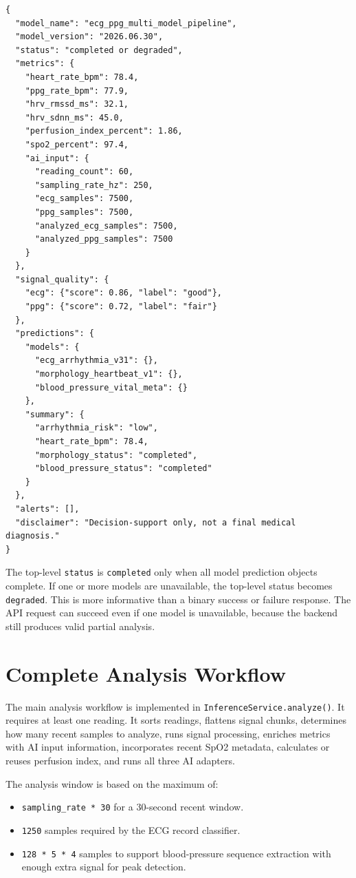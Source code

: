 \begin{lstlisting}[caption={Conceptual structure of an analysis result}]
{
  "model_name": "ecg_ppg_multi_model_pipeline",
  "model_version": "2026.06.30",
  "status": "completed or degraded",
  "metrics": {
    "heart_rate_bpm": 78.4,
    "ppg_rate_bpm": 77.9,
    "hrv_rmssd_ms": 32.1,
    "hrv_sdnn_ms": 45.0,
    "perfusion_index_percent": 1.86,
    "spo2_percent": 97.4,
    "ai_input": {
      "reading_count": 60,
      "sampling_rate_hz": 250,
      "ecg_samples": 7500,
      "ppg_samples": 7500,
      "analyzed_ecg_samples": 7500,
      "analyzed_ppg_samples": 7500
    }
  },
  "signal_quality": {
    "ecg": {"score": 0.86, "label": "good"},
    "ppg": {"score": 0.72, "label": "fair"}
  },
  "predictions": {
    "models": {
      "ecg_arrhythmia_v31": {},
      "morphology_heartbeat_v1": {},
      "blood_pressure_vital_meta": {}
    },
    "summary": {
      "arrhythmia_risk": "low",
      "heart_rate_bpm": 78.4,
      "morphology_status": "completed",
      "blood_pressure_status": "completed"
    }
  },
  "alerts": [],
  "disclaimer": "Decision-support only, not a final medical diagnosis."
}
\end{lstlisting}

The top-level \texttt{status} is \texttt{completed} only when all model prediction objects complete. If one or more models are unavailable, the top-level status becomes \texttt{degraded}. This is more informative than a binary success or failure response. The API request can succeed even if one model is unavailable, because the backend still produces valid partial analysis.

\section{Complete Analysis Workflow}

The main analysis workflow is implemented in \texttt{InferenceService.analyze()}. It requires at least one reading. It sorts readings, flattens signal chunks, determines how many recent samples to analyze, runs signal processing, enriches metrics with AI input information, incorporates recent SpO2 metadata, calculates or reuses perfusion index, and runs all three AI adapters.

The analysis window is based on the maximum of:

\begin{itemize}
    \item \texttt{sampling\_rate * 30} for a 30-second recent window.
    \item \texttt{1250} samples required by the ECG record classifier.
    \item \texttt{128 * 5 * 4} samples to support blood-pressure sequence extraction with enough extra signal for peak detection.
\end{itemize}

